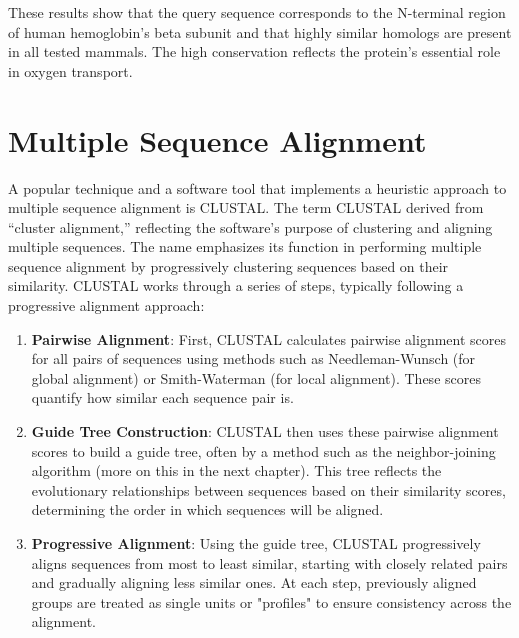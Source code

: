 These results show that the query sequence corresponds to the N-terminal region of human hemoglobin’s beta subunit and that highly similar homologs are present in all tested mammals. The high conservation reflects the protein’s essential role in oxygen transport.

\section{Multiple Sequence Alignment}

A popular technique and a software tool that implements a heuristic approach to multiple sequence alignment is CLUSTAL. 
The term CLUSTAL derived from ``cluster alignment,'' reflecting the software's purpose of clustering and aligning multiple sequences. The name emphasizes its function in performing multiple sequence alignment by progressively clustering sequences based on their similarity. CLUSTAL works through a series of steps, typically following a progressive alignment approach:

\begin{enumerate}
\item \textbf{Pairwise Alignment}: First, CLUSTAL calculates pairwise alignment scores for all pairs of sequences using methods such as Needleman-Wunsch (for global alignment) or Smith-Waterman (for local alignment). These scores quantify how similar each sequence pair is.
\item \textbf{Guide Tree Construction}: CLUSTAL then uses these pairwise alignment scores to build a guide tree, often by a method such as the neighbor-joining algorithm (more on this in the next chapter). This tree reflects the evolutionary relationships between sequences based on their similarity scores, determining the order in which sequences will be aligned.
\item \textbf{Progressive Alignment}: Using the guide tree, CLUSTAL progressively aligns sequences from most to least similar, starting with closely related pairs and gradually aligning less similar ones. At each step, previously aligned groups are treated as single units or "profiles" to ensure consistency across the alignment.
\end{enumerate}

